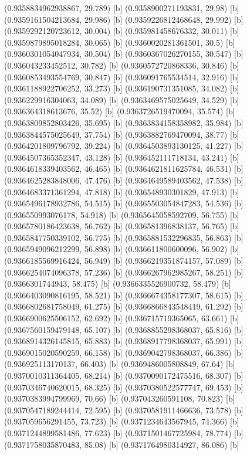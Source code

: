 {{{(0.9358834962938867, 29.789) [b] 
(0.9358900271193831, 29.98) [b] 
(0.9359161504213684, 29.986) [b] 
(0.9359226812468648, 29.992) [b] 
(0.9359292120723612, 30.004) [b] 
(0.935981458676332, 30.011) [b] 
(0.9359879895018284, 30.065) [b] 
(0.9360020281361501, 30.5) [b] 
(0.9360301054047934, 30.504) [b] 
(0.9360367026270155, 30.547) [b] 
(0.936043233452512, 30.782) [b] 
(0.9360572720868336, 30.846) [b] 
(0.9360853493554769, 30.847) [b] 
(0.936091765534514, 32.916) [b] 
(0.9361188922706252, 33.273) [b] 
(0.936190731351085, 34.082) [b] 
(0.936229916304063, 34.089) [b] 
(0.9363469575025649, 34.529) [b] 
(0.936364318613676, 35.52) [b] 
(0.9363726519470094, 35.574) [b] 
(0.9363809852803426, 35.695) [b] 
(0.9363834158358982, 35.984) [b] 
(0.9363844575025649, 37.754) [b] 
(0.9363882769470094, 38.77) [b] 
(0.9364201809796792, 39.224) [b] 
(0.9364503893130125, 41.227) [b] 
(0.9364507365352347, 43.128) [b] 
(0.936452111718134, 43.241) [b] 
(0.9364618339403562, 46.465) [b] 
(0.9364621811625784, 46.531) [b] 
(0.9364625283848006, 47.476) [b] 
(0.9364649589403562, 47.538) [b] 
(0.9364683371361294, 47.818) [b] 
(0.936548930301829, 47.913) [b] 
(0.9365496178932786, 54.515) [b] 
(0.9365503054847283, 54.536) [b] 
(0.936550993076178, 54.918) [b] 
(0.9365645058592709, 56.755) [b] 
(0.9365780186423638, 56.762) [b] 
(0.936581396838137, 56.765) [b] 
(0.9365847750339102, 56.775) [b] 
(0.9365881532296835, 56.863) [b] 
(0.9365949096212299, 56.898) [b] 
(0.936611800600096, 56.902) [b] 
(0.9366185569916424, 56.949) [b] 
(0.9366219351874157, 57.089) [b] 
(0.9366254074096378, 57.236) [b] 
(0.9366267962985267, 58.251) [b] 
(0.9366301744943, 58.475) [b] 
(0.9366335526900732, 58.479) [b] 
(0.9366403090816195, 58.521) [b] 
(0.9366674358177307, 58.615) [b] 
(0.9366802681758049, 61.275) [b] 
(0.9366866843548419, 61.292) [b] 
(0.9366900625506152, 62.692) [b] 
(0.936715719365065, 63.661) [b] 
(0.9367560159479148, 65.107) [b] 
(0.9368855298368037, 65.816) [b] 
(0.9368914326145815, 65.883) [b] 
(0.9368917798368037, 65.991) [b] 
(0.9369015020590259, 66.158) [b] 
(0.9369042798368037, 66.386) [b] 
(0.936925113170137, 66.403) [b] 
(0.9369486005808849, 67.64) [b] 
(0.9370010311364405, 68.214) [b] 
(0.9370090172475516, 68.307) [b] 
(0.9370346740620015, 68.325) [b] 
(0.9370380522577747, 69.453) [b] 
(0.9370383994799969, 70.66) [b] 
(0.937043260591108, 70.823) [b] 
(0.9370547189244414, 72.595) [b] 
(0.9370581911466636, 73.578) [b] 
(0.937059656291455, 73.723) [b] 
(0.9371234643567945, 74.366) [b] 
(0.9371244899581486, 77.623) [b] 
(0.9371501467725984, 78.774) [b] 
(0.9371758035870483, 85.08) [b] 
(0.9371764980314927, 86.086) [b] 
}}}
